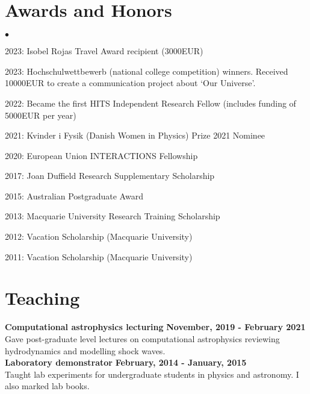 \documentclass[margin,line]{res}
\newenvironment{list2}{
	\begin{list}{$\bullet$}{%
			\setlength{\itemsep}{0in}
			\setlength{\parsep}{0in} \setlength{\parskip}{0in}
			\setlength{\topsep}{0in} \setlength{\partopsep}{0in} 
			\setlength{\leftmargin}{0.2in}}}{\end{list}}
\begin{document}
\begin{resume}
		\section{\sc Awards and Honors}
		\begin{list2}
                \item 2023: Isobel Rojas Travel Award recipient (3000EUR)
                \item 2023: Hochschulwettbewerb (national college competition) winners. Received 10000EUR to create a communication project about `Our Universe'.
                \item 2022: Became the first HITS Independent Research Fellow (includes funding of 5000EUR per year)
			\item 2021: Kvinder i Fysik (Danish Women in Physics) Prize 2021 Nominee
			\item 2020: European Union INTERACTIONS Fellowship
			\item 2017: Joan Duffield Research Supplementary Scholarship
			\item 2015: Australian Postgraduate Award
			\item 2013: Macquarie University Research Training Scholarship
			\item 2012: Vacation Scholarship (Macquarie University)
			\item 2011: Vacation Scholarship (Macquarie University)
		\end{list2}
		
		\section{\sc Teaching}
		{\bf Computational astrophysics lecturing} \hfill {\bf November, 2019 - February 2021}\\
		Gave post-graduate level lectures on computational astrophysics reviewing hydrodynamics and modelling shock waves.\\
            {\bf Laboratory demonstrator} \hfill {\bf February, 2014 - January, 2015}\\
	    Taught lab experiments for undergraduate students in physics and astronomy. I also marked lab books.\\

        \vspace*{-0.7
        cm}


\end{resume}
\end{document}
